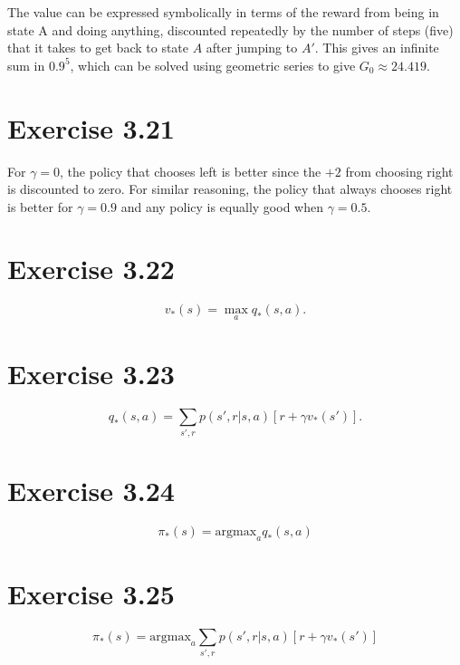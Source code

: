 \documentclass[a4paper, 12pt, titlepage]{article}
\begin{document}
The value can be expressed symbolically in terms of the reward from being in
state A and doing anything, discounted repeatedly by the number of steps (five)
that it takes to get back to state $A$ after jumping to $A'$. This gives an
infinite sum in $0.9^5$, which can be solved using geometric series to give
$G_0 \approx 24.419$.


\section{Exercise 3.21}

For $\gamma = 0$, the policy that chooses left is better since the $+2$ from
choosing right is discounted to zero. For similar reasoning, the policy that
always chooses right is better for $\gamma = 0.9$ and any policy is equally
good when $\gamma = 0.5$.


\section{Exercise 3.22}

\begin{equation*}
        v_*(s) = \max_a q_*(s, a).
\end{equation*}


\section{Exercise 3.23}

\begin{equation*}
        q_*(s, a) = \sum_{s', r} p(s', r | s, a) [r + \gamma v_*(s')].
\end{equation*}


\section{Exercise 3.24}

\begin{equation*}
        \pi_*(s) = \textrm{argmax}_a q_*(s, a)
\end{equation*}


\section{Exercise 3.25}

\begin{equation*}
        \pi_*(s) =
                \textrm{argmax}_a \sum_{s', r} p(s', r | s, a) [r + \gamma v_*(s')]
\end{equation*}
\end{document}
